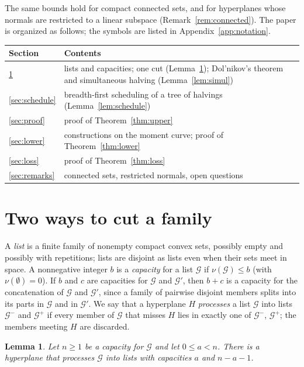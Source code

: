 \documentclass[11pt]{amsart}
\newtheorem{lemma}[theorem]{Lemma}
\theoremstyle{remark}
\newcommand{\G}{\mathcal G}
\begin{document}
The same bounds hold for compact connected sets, and for hyperplanes whose normals are restricted to a linear subspace
(Remark~\ref{rem:connected}). The paper is organized as follows; the symbols are listed in Appendix~\ref{app:notation}.

\begin{center}
\begin{tabular}{@{}lp{}@{}}
\toprule
Section & Contents \\
\midrule
\ref{sec:cuts} & lists and capacities; one cut (Lemma~\ref{lem:onecut}); Dol'nikov's theorem and simultaneous halving
(Lemma~\ref{lem:simul}) \\
\ref{sec:schedule} & breadth-first scheduling of a tree of halvings (Lemma~\ref{lem:schedule}) \\
\ref{sec:proof} & proof of Theorem~\ref{thm:upper} \\
\ref{sec:lower} & constructions on the moment curve; proof of Theorem~\ref{thm:lower} \\
\ref{sec:loss} & proof of Theorem~\ref{thm:loss} \\
\ref{sec:remarks} & connected sets, restricted normals, open questions \\
\bottomrule
\end{tabular}
\end{center}

\section{Two ways to cut a family}\label{sec:cuts}

A \emph{list} is a finite family of nonempty compact convex sets, possibly empty and possibly with repetitions; lists
are disjoint as lists even when their sets meet in space. A nonnegative integer $b$ is a \emph{capacity} for a list
$\G$ if $\nu(\G)\le b$ (with $\nu(\emptyset)=0$). If $b$ and $c$ are capacities for $\G$ and $\G'$, then $b+c$ is a
capacity for the concatenation of $\G$ and $\G'$, since a family of pairwise disjoint members splits into its parts in
$\G$ and in $\G'$. We say that a hyperplane $H$ \emph{processes} a list $\G$ into lists $\G^-$ and $\G^+$ if every
member of $\G$ that misses $H$ lies in exactly one of $\G^-$, $\G^+$; the members meeting $H$ are discarded.

\begin{lemma}\label{lem:onecut}
Let $n\ge1$ be a capacity for $\G$ and let $0\le a<n$. There is a hyperplane that processes $\G$ into lists with
capacities $a$ and $n-a-1$.
\end{lemma}
\end{document}
